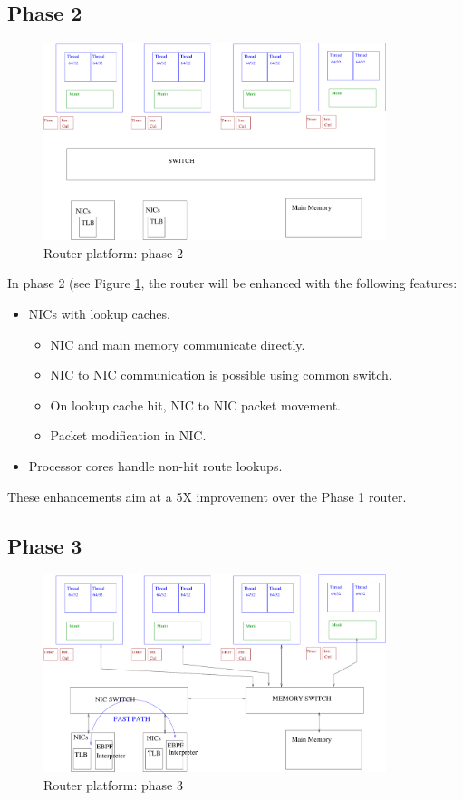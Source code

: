 \documentclass{article}
\begin{document}
\subsection{Phase 2}

\begin{figure}
  \centering
  \includegraphics[width=10cm]{figs/Router_II.pdf}
  \caption{Router platform: phase 2}
  \label{fig:Phase2}
\end{figure}

In phase 2 (see Figure \ref{fig:Phase2}, 
the router will be enhanced with the following features:
\begin{itemize}
\item NICs with lookup caches.
\begin{itemize}
\item NIC and main memory communicate directly.
\item NIC to NIC communication is possible using
common switch.
\item On lookup cache hit, NIC to NIC packet
movement.
\item Packet modification in NIC.
\end{itemize}
\item Processor cores handle non-hit route lookups.
\end{itemize}
These enhancements aim at a 5X improvement over the Phase 1 router.

\subsection{Phase 3}
\begin{figure}
  \centering
  \includegraphics[width=10cm]{figs/Router_III.pdf}
  \caption{Router platform: phase 3}
   \label{fig:Phase3}
\end{figure}
\end{document}
